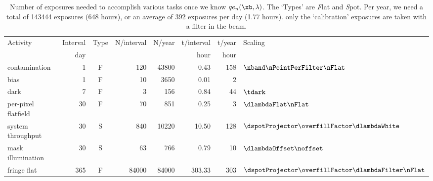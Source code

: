 \begin{table}
\begin{center}
  \begin{tabular}{lrcrrrrl}
Activity             & Interval & Type & N/interval & N/year & t/interval & t/year & Scaling \\
                     &      day &      &            &        &       hour &   hour &  \\
\hline
contamination        &        1 &    F &        120 &  43800 &       0.43 &    158 & $\nband \nPointPerFilter \nFlat$ \\
bias                 &        1 &    F &         10 &   3650 &       0.01 &      2 &  \\
dark                 &        7 &    F &          3 &    156 &       0.84 &     44 & $\tdark$ \\
per-pixel flatfield  &       30 &    F &         70 &    851 &       0.25 &      3 & $\dlambdaFlat \nFlat$ \\
system throughput    &       30 &    S &        840 &  10220 &      10.50 &    128 & $\dspotProjector \overfillFactor \dlambdaWhite$ \\
mask illumination    &       30 &    S &         63 &    766 &       0.79 &     10 & $\dlambdaOffset \noffset$ \\
fringe flat          &      365 &    F &      84000 &  84000 &     303.33 &    303 & $\dspotProjector \overfillFactor \dlambdaFilter \nFlat$ \\
\end{tabular}
  \caption{Number of exposures needed to accomplish various tasks once we know $qe_n(\xb, \lambda)$.
    The `Types' are \textit{F}lat and \textit{S}pot.
    Per year, we need a total of 143444 exposures (648 hours),
    or an average of 392 exposures per day (1.77 hours).  \Nb only the `calibration' exposures
    are taken with a filter in the beam.
    }
  \label{tab:NExposure}
\end{center}
\end{table}
    
